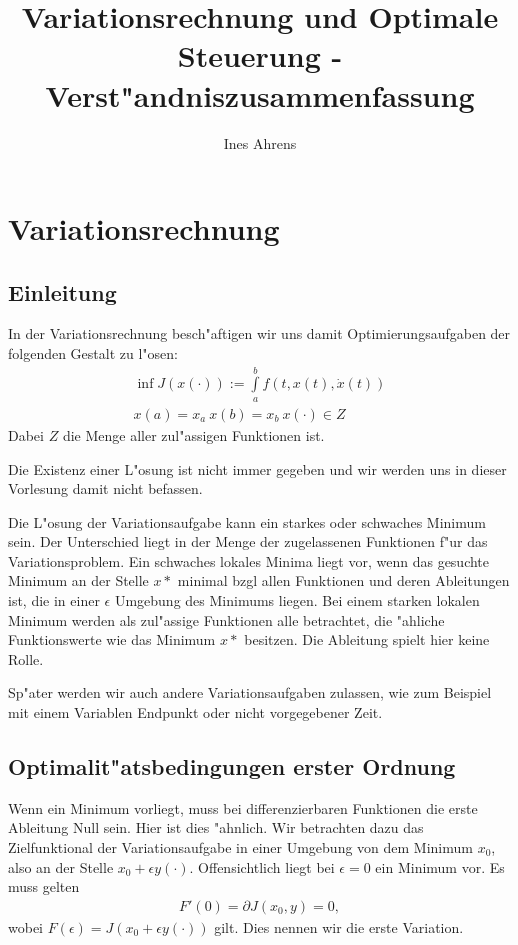 \documentclass[pdftex,a4paper,oneside]{scrbook}
\title{Variationsrechnung und Optimale Steuerung - Verst"andniszusammenfassung}
\author{Ines Ahrens}
\begin{document}
\maketitle

\chapter{Variationsrechnung}

\section{Einleitung}
In der Variationsrechnung besch"aftigen wir uns damit Optimierungsaufgaben der folgenden Gestalt zu l"osen:
\begin{align*}
	\inf J(x(\cdot)) := \int\limits_a^b f(t,x(t),\dot{x}(t))\\
	x(a)= x_a \: x(b)=x_b \: x(\cdot) \in Z  
\end{align*}
Dabei $Z$ die Menge aller zul"assigen Funktionen ist. 

Die Existenz einer L"osung ist nicht immer gegeben und wir werden uns in dieser Vorlesung damit nicht befassen. 

Die L"osung der Variationsaufgabe kann ein starkes oder schwaches Minimum sein. Der Unterschied liegt in der Menge der zugelassenen Funktionen f"ur das Variationsproblem. Ein schwaches lokales Minima liegt vor, wenn das gesuchte Minimum an der Stelle $x*$ minimal bzgl allen Funktionen und deren Ableitungen ist, die in einer $\epsilon$ Umgebung des Minimums liegen. Bei einem starken lokalen Minimum werden als zul"assige Funktionen alle betrachtet, die "ahliche Funktionswerte wie das Minimum $x*$ besitzen. Die Ableitung spielt hier keine Rolle. 

Sp"ater werden wir auch andere Variationsaufgaben zulassen, wie zum Beispiel mit einem Variablen Endpunkt oder nicht vorgegebener Zeit. 

\section{Optimalit"atsbedingungen erster Ordnung}

Wenn ein Minimum vorliegt, muss bei differenzierbaren Funktionen die erste Ableitung Null sein. Hier ist dies "ahnlich. Wir betrachten dazu das Zielfunktional der Variationsaufgabe in einer Umgebung von dem Minimum $x_0$, also an der Stelle $x_0 + \epsilon y(\cdot)$. Offensichtlich liegt bei $\epsilon = 0$ ein Minimum vor. Es muss gelten 
\begin{align*}
	F'(0)= \partial J(x_0, y) = 0,
\end{align*}
wobei $F(\epsilon)= J(x_0+ \epsilon y(\cdot))$ gilt. Dies nennen wir die erste Variation. 
\end{document}
